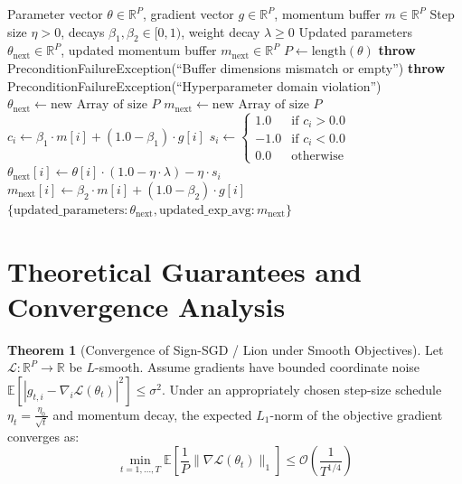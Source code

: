 \documentclass[11pt,a4paper]{article}
\theoremstyle{definition}
\newtheorem{theorem}{Theorem}[section]
\begin{document}
\begin{algorithm}[H]
\caption{Lion (EvoLved Sign Momentum) Step Execution}
\begin{algorithmic}[1]
\Require Parameter vector $\theta \in \mathbb{R}^P$, gradient vector $g \in \mathbb{R}^P$, momentum buffer $m \in \mathbb{R}^P$
\Require Step size $\eta > 0$, decays $\beta_1, \beta_2 \in [0, 1)$, weight decay $\lambda \ge 0$
\Ensure Updated parameters $\theta_{\text{next}} \in \mathbb{R}^P$, updated momentum buffer $m_{\text{next}} \in \mathbb{R}^P$
\State $P \gets \text{length}(\theta)$
    \State \textbf{throw} PreconditionFailureException(``Buffer dimensions mismatch or empty'')
\EndIf
{}
    \State \textbf{throw} PreconditionFailureException(``Hyperparameter domain violation'')
\EndIf
\State $\theta_{\text{next}} \gets \text{new Array of size } P$
\State $m_{\text{next}} \gets \text{new Array of size } P$
    \State $c_i \gets \beta_1 \cdot m[i] + (1.0 - \beta_1) \cdot g[i]$
    \State $s_i \gets \begin{cases} 1.0 & \text{if } c_i > 0.0 \\ -1.0 & \text{if } c_i < 0.0 \\ 0.0 & \text{otherwise} \end{cases}$
    \State $\theta_{\text{next}}[i] \gets \theta[i] \cdot (1.0 - \eta \cdot \lambda) - \eta \cdot s_i$
    \State $m_{\text{next}}[i] \gets \beta_2 \cdot m[i] + (1.0 - \beta_2) \cdot g[i]$
\EndFor
\State \Return $\{\text{updated\_parameters}: \theta_{\text{next}}, \text{updated\_exp\_avg}: m_{\text{next}}\}$
\end{algorithmic}
\end{algorithm}

\section{Theoretical Guarantees and Convergence Analysis}

\begin{theorem}[Convergence of Sign-SGD / Lion under Smooth Objectives]
Let $\mathcal{L}: \mathbb{R}^P \to \mathbb{R}$ be $L$-smooth. Assume gradients have bounded coordinate noise $\mathbb{E}[|g_{t, i} - \nabla_i \mathcal{L}(\theta_t)|^2] \le \sigma^2$. Under an appropriately chosen step-size schedule $\eta_t = \frac{\eta_0}{\sqrt{t}}$ and momentum decay, the expected $L_1$-norm of the objective gradient converges as:
\begin{equation}
\min_{t=1, \dots, T} \mathbb{E}\left[\frac{1}{P} \|\nabla \mathcal{L}(\theta_t)\|_1\right] \le \mathcal{O}\left(\frac{1}{T^{1/4}}\right)
\end{equation}
\end{theorem}
\end{document}
